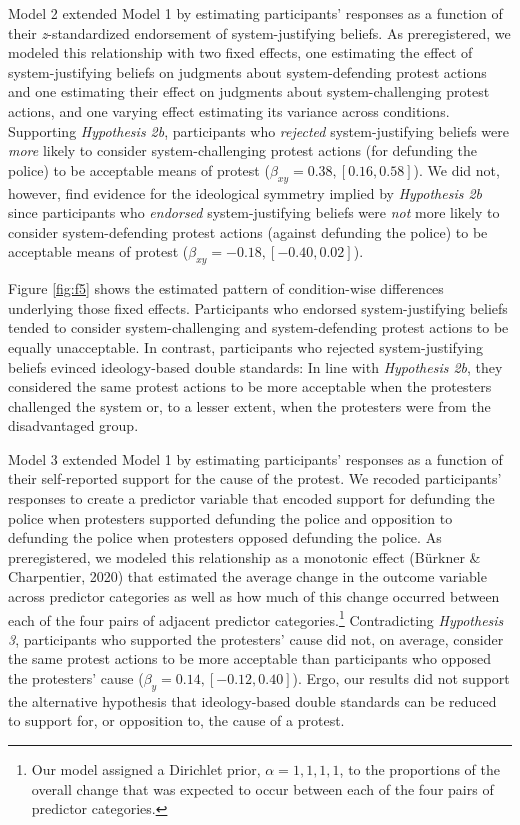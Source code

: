 \documentclass[12pt, letterpaper]{article}
\begin{document}
Model 2 extended Model 1 by estimating participants' responses as a
function of their \emph{z}-standardized endorsement of system-justifying
beliefs. As preregistered, we modeled this relationship with two fixed
effects, one estimating the effect of system-justifying beliefs on
judgments about system-defending protest actions and one estimating
their effect on judgments about system-challenging protest actions, and
one varying effect estimating its variance across conditions. Supporting
\emph{Hypothesis 2b}, participants who \emph{rejected} system-justifying
beliefs were \emph{more} likely to consider system-challenging protest
actions (for defunding the police) to be acceptable means of protest
(\(\beta_{xy} = 0.38, [0.16, 0.58]\)). We did not, however, find
evidence for the ideological symmetry implied by \emph{Hypothesis 2b}
since participants who \emph{endorsed} system-justifying beliefs were
\emph{not} more likely to consider system-defending protest actions
(against defunding the police) to be acceptable means of protest
(\(\beta_{xy} = -0.18, [-0.40, 0.02]\)).

Figure \ref{fig:f5} shows the estimated pattern of condition-wise
differences underlying those fixed effects. Participants who endorsed
system-justifying beliefs tended to consider system-challenging and
system-defending protest actions to be equally unacceptable. In
contrast, participants who rejected system-justifying beliefs evinced
ideology-based double standards: In line with \emph{Hypothesis 2b}, they
considered the same protest actions to be more acceptable when the
protesters challenged the system or, to a lesser extent, when the
protesters were from the disadvantaged group.

Model 3 extended Model 1 by estimating participants' responses as a
function of their self-reported support for the cause of the protest. We
recoded participants' responses to create a predictor variable that
encoded support for defunding the police when protesters supported
defunding the police and opposition to defunding the police when
protesters opposed defunding the police. As preregistered, we modeled
this relationship as a monotonic effect (Bürkner \& Charpentier, 2020)
that estimated the average change in the outcome variable across
predictor categories as well as how much of this change occurred between
each of the four pairs of adjacent predictor categories.\footnote{Our
  model assigned a Dirichlet prior, \(\alpha = {1, 1, 1, 1}\), to the
  proportions of the overall change that was expected to occur between
  each of the four pairs of predictor categories.} Contradicting
\emph{Hypothesis 3}, participants who supported the protesters' cause
did not, on average, consider the same protest actions to be more
acceptable than participants who opposed the protesters' cause
(\(\beta_{y} = 0.14, [-0.12, 0.40]\)). Ergo, our results did not support
the alternative hypothesis that ideology-based double standards can be
reduced to support for, or opposition to, the cause of a protest.
\end{document}
